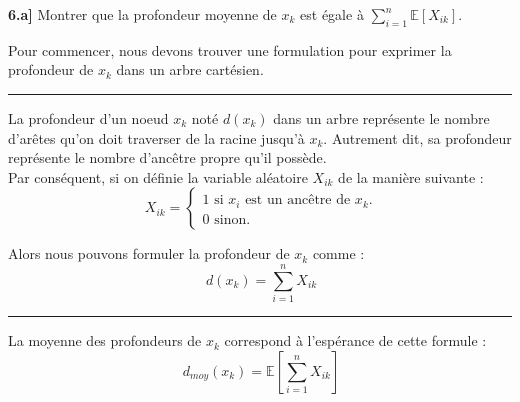 \documentclass[a4paper,12pt]{report}
\begin{document}

\vspace{1.5cm}

\textbf{6.a]} Montrer que la profondeur moyenne de \( x_k \) est égale à \(\sum_{i = 1}^{n} \mathbb{E}[X_{ik}]\).



\begin{tcolorbox}[colback=gray!10, colframe=blue!30, coltitle=black, title=Réponse à la 6.a - 1/2]

    Pour commencer, nous devons trouver une formulation pour exprimer la profondeur de \( x_k \) dans un arbre cartésien.

    \vspace{0.5cm}
    \hrule
    \vspace{0.5cm}

    La profondeur d'un noeud \( x_k \) noté \( d(x_k) \) dans un arbre représente le nombre d'arêtes qu'on doit traverser de la racine jusqu'à \( x_k \). Autrement dit,
        sa profondeur représente le nombre d'ancêtre propre qu'il possède.\\

    Par conséquent, si on définie la variable aléatoire \( X_{ik} \) de la manière suivante :
    \[
    \ X_{ik} =
    \begin{cases}
        1 \text{ si \(x_i\) est un ancêtre de \(x_k\).} \\
        0 \text{ sinon.}
    \end{cases}
    \]

    \vspace{0.5cm}

    Alors nous pouvons formuler la profondeur de \( x_k \) comme :
    \[
    \ d(x_k) = \sum_{i=1}^{n} X_{ik}
    \]

    \vspace{0.5cm}
    \hrule
    \vspace{0.5cm}

    La moyenne des profondeurs de \( x_k \) correspond à l'espérance de cette formule :
    \[
    \ d_{moy}(x_k) = \mathbb{E}[\sum_{i = 1}^{n} X_{ik}]
    \]

\end{tcolorbox}
\end{document}
